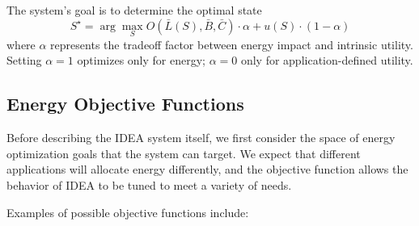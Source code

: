 The system's goal is to determine the optimal state \[ S^\star = \arg
\max_{S} O(\bar{L}(S), \bar{B}, \bar{C}) \cdot \alpha + u(S) \cdot
(1-\alpha)\] where $\alpha$ represents the tradeoff factor between energy
impact and intrinsic utility. Setting $\alpha=1$ optimizes only for energy;
$\alpha=0$ only for application-defined utility. 

\subsection{Energy Objective Functions}
\label{idea-subsec-energyobjectivefunctions}

Before describing the IDEA system itself, we first consider the space of
energy optimization goals that the system can target. We expect that
different applications will allocate energy differently, and the objective
function allows the behavior of IDEA to be tuned to meet a variety of needs. 

Examples of possible objective functions include:

